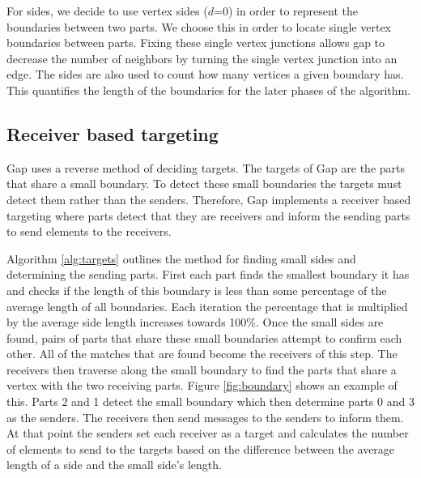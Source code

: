\documentclass{thesis}
\begin{document}
For sides, we decide to use vertex sides ($d$=0) in order to represent the 
boundaries between two parts. We choose this in order to locate single vertex 
boundaries between parts. Fixing these single vertex junctions allows gap to 
decrease the number of neighbors by turning the single vertex junction into 
an edge. The sides are also used to count how many vertices a given boundary 
has. This quantifies the length of the boundaries for the later phases of the 
algorithm.

\subsection{Receiver based targeting}

Gap uses a reverse method of deciding targets. The targets of Gap are the 
parts that share a small boundary. To detect these small boundaries the 
targets must detect them rather than the senders. Therefore, Gap implements 
a receiver based targeting where parts detect that they are receivers and 
inform the sending parts to send elements to the receivers. 

Algorithm \ref{alg:targets} outlines the method for finding small sides 
and determining the sending parts. First each part finds the smallest 
boundary it has and checks if the length of this boundary is less than 
some percentage of the average length of all boundaries. Each iteration 
the percentage that is multiplied by the average side length increases 
towards 100\%. Once the small sides are found, pairs of parts that share 
these small boundaries attempt to confirm each other. All of the matches 
that are found become the receivers of this step. The receivers then 
traverse along the small boundary to find the parts that share a vertex 
with the two receiving parts. Figure \ref{fig:boundary} shows an example 
of this. Parts 2 and 1 detect the small boundary which then determine 
parts 0 and 3 as the senders. The receivers then send messages to the 
senders to inform them. At that point the senders set each receiver as a 
target and calculates the number of elements to send to the targets 
based on the difference between the average length of a side and the 
small side's length.
\end{document}
